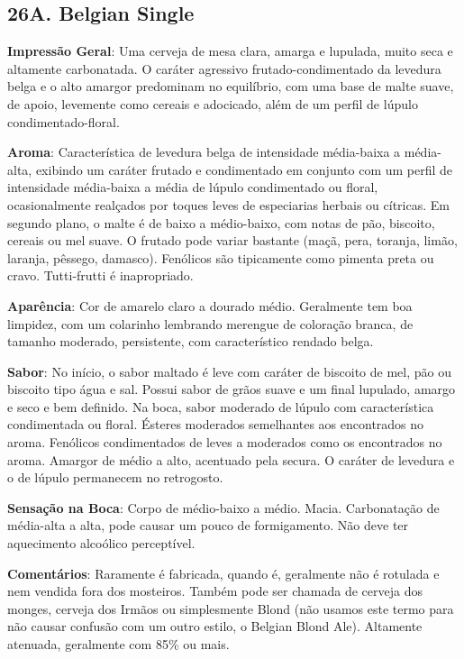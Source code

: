 \subsection*{26A. Belgian Single}
\textbf{Impressão Geral}: Uma cerveja de mesa clara, amarga e lupulada, muito seca e altamente carbonatada. O caráter agressivo frutado-condimentado da levedura belga e o alto amargor predominam no equilíbrio, com uma base de malte suave, de apoio, levemente como cereais e adocicado, além de um perfil de lúpulo condimentado-floral.

\textbf{Aroma}: Característica de levedura belga de intensidade média-baixa a média-alta, exibindo um caráter frutado e condimentado em conjunto com um perfil de intensidade média-baixa a média de lúpulo condimentado ou floral, ocasionalmente realçados por toques leves de especiarias herbais ou cítricas. Em segundo plano, o malte é de baixo a médio-baixo, com notas de pão, biscoito, cereais ou mel suave. O frutado pode variar bastante (maçã, pera, toranja, limão, laranja, pêssego, damasco). Fenólicos são tipicamente como pimenta preta ou cravo. Tutti-frutti é inapropriado.

\textbf{Aparência}: Cor de amarelo claro a dourado médio. Geralmente tem boa limpidez, com um colarinho lembrando merengue de coloração branca, de tamanho moderado, persistente, com característico rendado belga.

\textbf{Sabor}: No início, o sabor maltado é leve com caráter de biscoito de mel, pão ou biscoito tipo água e sal. Possui sabor de grãos suave e um final lupulado, amargo e seco e bem definido. Na boca, sabor moderado de lúpulo com característica condimentada ou floral. Ésteres moderados semelhantes aos encontrados no aroma. Fenólicos condimentados de leves a moderados como os encontrados no aroma. Amargor de médio a alto, acentuado pela secura. O caráter de levedura e o de lúpulo permanecem no retrogosto.

\textbf{Sensação na Boca}: Corpo de médio-baixo a médio. Macia. Carbonatação de média-alta a alta, pode causar um pouco de formigamento. Não deve ter aquecimento alcoólico perceptível.

\textbf{Comentários}: Raramente é fabricada, quando é, geralmente não é rotulada e nem vendida fora dos mosteiros. Também pode ser chamada de cerveja dos monges, cerveja dos Irmãos ou simplesmente Blond (não usamos este termo para não causar confusão com um outro estilo, o Belgian Blond Ale). Altamente atenuada, geralmente com 85\% ou mais.

